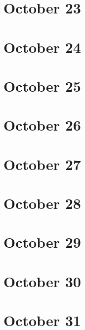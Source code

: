 \section{October 23}

\section{October 24}

\section{October 25}

\section{October 26}

\section{October 27}

\section{October 28}

\section{October 29}

\section{October 30}

\section{October 31}

